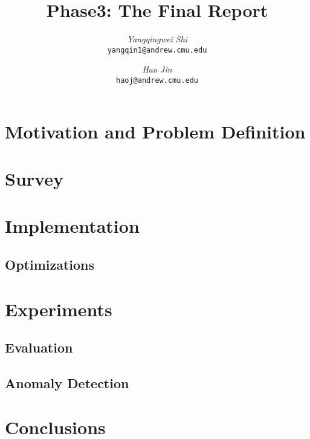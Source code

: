 \documentclass[12pt]{article}
\begin{document}
\newcommand{\beq}{\begin{equation}}
\newcommand{\eeq}{\end{equation}}
\newcommand{\bit}{\begin{itemize*}}
\newcommand{\eit}{\end{itemize*}}
\newcommand{\goal}[1]{ {\noindent {$\Rightarrow$} \em {#1} } }
\newcommand{\hide}[1]{}
\newcommand{\comment}[1]{ {\footnotesize {#1} } }
\newtheorem{lemma}{Lemma}
\newtheorem{theorem}{Theorem}
\newtheorem{proof}{Proof}
\newtheorem{defn}{Definition}
\newtheorem{algo}{Algorithm}
\newtheorem{observation}{Observation}

\title{Phase3: The Final Report}


\author{ {\em Yangqingwei Shi} \\	   
	    {\tt yangqin1@andrew.cmu.edu}
	 \and
	 {\em Hao Jin} \\
	     {\tt haoj@andrew.cmu.edu}}
\maketitle

\section{Motivation and Problem Definition}
    \label{sec:intro}
    
\newpage
\section{Survey}
    \label{sec:survey}
    
	   
\newpage
\section{Implementation}
\subsection{Optimizations}
	\label{sec:imp}
	
	
\newpage
\section{Experiments}
\subsection{Evaluation}
	\label{sec:expeval}
	
\newpage
\subsection{Anomaly Detection}
	\label{sec:expanal}
	

\newpage
\section{Conclusions}
	\label{sec:concl}
	


\newpage




\newpage
{}
\end{document}
